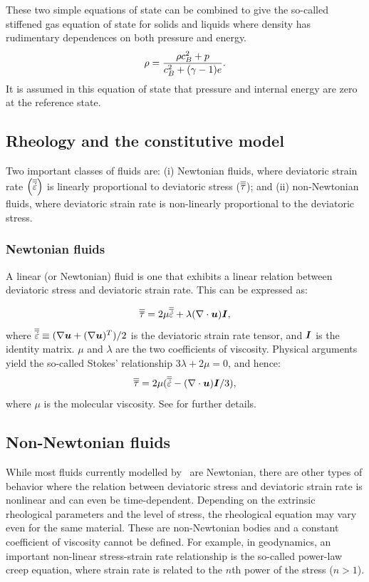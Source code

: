 These two simple equations of state can be combined to give the so-called stiffened gas equation of state for solids and liquids where density has rudimentary dependences on both pressure and energy.  
\begin{equation}
\rho = \frac{\rho c_B^2 + p}{c_B^2 + (\gamma-1)e}.
\end{equation}
It is assumed in this equation of state that pressure and internal energy are zero at the reference state.

\subsection{Rheology and the constitutive model}\label{Sect:Rheology}
Two important classes of fluids are: (i) Newtonian fluids, where deviatoric strain rate $\left(\overline{\overline{\dot{\varepsilon}}}\right)$ is linearly proportional to deviatoric stress ($\overline{\overline{\tau}}$); and (ii) non-Newtonian fluids, where deviatoric strain rate is non-linearly proportional to the deviatoric stress. 

\subsubsection{Newtonian fluids}

A linear (or Newtonian) fluid is one that exhibits a linear relation between deviatoric stress and deviatoric strain rate. This can be expressed as: 

\begin{equation}
\overline{\overline{\tau}} = 2\mu \overline{\overline{\dot{\varepsilon}}} + \lambda(\nabla\cdot{\mbox{\boldmath$u$}}){\mbox{\boldmath$I$}},
\end{equation}
where $\overline{\overline{\dot{\varepsilon}}} \equiv(\nabla{\mbox{\boldmath$u$}} + (\nabla{\mbox{\boldmath$u$}})^T)/2$ is the
deviatoric strain rate tensor, and ${\mbox{\boldmath$I$}}$ is the identity matrix. $\mu$ and
$\lambda$ are the two coefficients of viscosity. Physical arguments
yield the so-called Stokes' relationship $3\lambda+2\mu=0$, and
hence:
\begin{equation}
\overline{\overline{\tau}} = 2\mu(\overline{\overline{\dot{\varepsilon}}} - (\nabla\cdot{\mbox{\boldmath$u$}}){\mbox{\boldmath$I$}}/3),
\end{equation}
where $\mu$ is the molecular viscosity. See \cite{batchelor1967} for further
details.

\subsection{Non-Newtonian fluids}
While most fluids currently modelled by \fluidity\ are Newtonian, there are other types of behavior where the relation between deviatoric stress and deviatoric strain rate is nonlinear and can even be time-dependent. Depending on the extrinsic rheological parameters and the level of stress, the rheological equation may vary even for the same material. These are non-Newtonian bodies and a constant coefficient of viscosity cannot be defined. For example, in geodynamics, an important non-linear stress-strain rate relationship is the so-called power-law creep equation, where strain rate is related to the $n$th power of the stress ($n > 1$).

